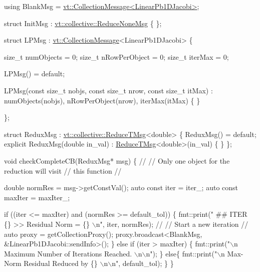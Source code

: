 \begin{DoxyCodeInclude}
  \textcolor{keyword}{using} BlankMsg = \hyperlink{structvt_1_1vrt_1_1collection_1_1_collection_message}{vt::CollectionMessage<LinearPb1DJacobi>};

  \textcolor{keyword}{struct }InitMsg : \hyperlink{structvt_1_1collective_1_1reduce_1_1operators_1_1_reduce_t_msg}{vt::collective::ReduceNoneMsg} \{ \};

  \textcolor{keyword}{struct }LPMsg : \hyperlink{structvt_1_1vrt_1_1collection_1_1_collection_message}{vt::CollectionMessage}<LinearPb1DJacobi> \{

    \textcolor{keywordtype}{size\_t} numObjects = 0;
    \textcolor{keywordtype}{size\_t} nRowPerObject = 0;
    \textcolor{keywordtype}{size\_t} iterMax = 0;

    LPMsg() = \textcolor{keywordflow}{default};

    LPMsg(\textcolor{keyword}{const} \textcolor{keywordtype}{size\_t} nobjs, \textcolor{keyword}{const} \textcolor{keywordtype}{size\_t} nrow, \textcolor{keyword}{const} \textcolor{keywordtype}{size\_t} itMax) :
      numObjects(nobjs), nRowPerObject(nrow), iterMax(itMax)
    \{ \}

  \};

  \textcolor{keyword}{struct }ReduxMsg : \hyperlink{structvt_1_1collective_1_1reduce_1_1operators_1_1_reduce_t_msg}{vt::collective::ReduceTMsg}<double> \{
    ReduxMsg() = \textcolor{keywordflow}{default};
    \textcolor{keyword}{explicit} ReduxMsg(\textcolor{keywordtype}{double} in\_val) : \hyperlink{namespacevt_1_1collective_a28b82d5d48c9bc6e4fd738fcbf9e0f62}{ReduceTMsg}<double>(in\_val) \{ \}
  \};

  \textcolor{keywordtype}{void} checkCompleteCB(ReduxMsg* msg) \{
    \textcolor{comment}{//}
    \textcolor{comment}{// Only one object for the reduction will visit}
    \textcolor{comment}{// this function}
    \textcolor{comment}{//}

    \textcolor{keywordtype}{double} normRes = msg->getConstVal();
    \textcolor{keyword}{auto} \textcolor{keyword}{const} iter = iter\_;
    \textcolor{keyword}{auto} \textcolor{keyword}{const} maxIter = maxIter\_;

    \textcolor{keywordflow}{if} ((iter <= maxIter) and (normRes >= default\_tol)) \{
      fmt::print(\textcolor{stringliteral}{" ## ITER \{\} >> Residual Norm = \{\} \(\backslash\)n"}, iter, normRes);
      \textcolor{comment}{//}
      \textcolor{comment}{// Start a new iteration}
      \textcolor{comment}{//}
      \textcolor{keyword}{auto} proxy = getCollectionProxy();
      proxy.broadcast<BlankMsg, &LinearPb1DJacobi::sendInfo>();
    \}
    \textcolor{keywordflow}{else} \textcolor{keywordflow}{if} (iter > maxIter) \{
      fmt::print(\textcolor{stringliteral}{"\(\backslash\)n Maximum Number of Iterations Reached. \(\backslash\)n\(\backslash\)n"});
    \}
    \textcolor{keywordflow}{else}\{
      fmt::print(\textcolor{stringliteral}{"\(\backslash\)n Max-Norm Residual Reduced by \{\} \(\backslash\)n\(\backslash\)n"}, default\_tol);
    \}
  \}


\end{DoxyCodeInclude}
